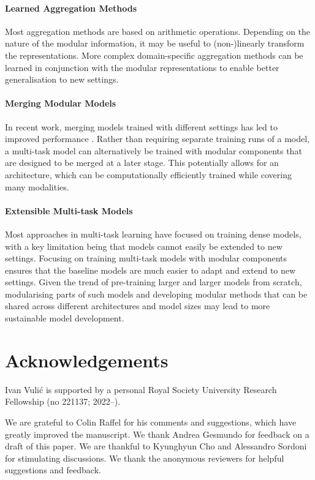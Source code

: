 \documentclass[10pt]{article} %
\begin{document}
\paragraph*{Learned Aggregation Methods} Most aggregation methods are based on arithmetic operations. Depending on the nature of the modular information, it may be useful to (non-)linearly transform the representations. More complex domain-specific aggregation methods can be learned in conjunction with the modular representations to enable better generalisation to new settings. 

\paragraph*{Merging Modular Models} In recent work, merging models trained with different settings has led to improved performance \citep[\textit{inter alia}]{Wortsman2022ModelSoups}. Rather than requiring separate training runs of a model, a multi-task model can alternatively be trained with modular components that are designed to be merged at a later stage. This potentially allows for an architecture, which can be computationally efficiently trained while covering many modalities. 

\paragraph*{Extensible Multi-task Models}  Most approaches in multi-task learning have focused on training dense models, with a key limitation being that models cannot easily be extended to new settings. Focusing on training multi-task models with modular components ensures that the baseline models are much easier to adapt and extend to new settings. Given the trend of pre-training larger and larger models from scratch, modularising parts of such models and developing modular methods that can be shared across different architectures and model sizes may lead to more sustainable model development.

 
\section*{Acknowledgements}

Ivan Vuli\'{c} is supported by a personal Royal Society University Research Fellowship (no 221137; 2022--).

We are grateful to Colin Raffel for his comments and suggestions, which have greatly improved the manuscript. We thank Andrea Gesmundo for feedback on a draft of this paper. We are thankful to Kyunghyun Cho and Alessandro Sordoni for stimulating discussions. We thank the anonymous reviewers for helpful suggestions and feedback.
 




\end{document}
